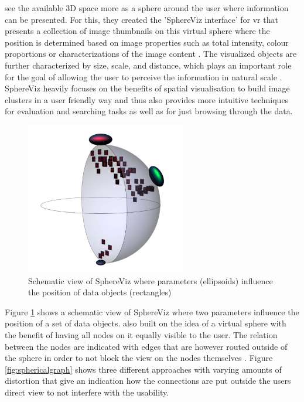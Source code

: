 \cite{Soldati2007} see the available 3D space more as a sphere around the user where information can be presented. For this, they created the 'SphereViz interface' for \gls{vr} that presents a collection of image thumbnails on this virtual sphere where the position is determined based on image properties such as total intensity, colour proportions or characterizations of the image content \citep{Soldati2007}. The visualized objects are further characterized by size, scale, and distance, which plays an important role for the goal of allowing the user to perceive the information in natural scale \citep{Soldati2007}. SphereViz heavily focuses on the benefits of spatial visualisation to build image clusters in a user friendly way and thus also provides more intuitive techniques for evaluation and searching tasks as well as for just browsing through the data.
\begin{figure}[h]
	\begin{center}
		\includegraphics[width=7cm]{03_Figures/05_LitReview/Soldati2007_SphereViz.png}
		\caption[Schematic view of SphereViz where parameters influence the position of data objects]{Schematic view of SphereViz where parameters (ellipsoids) influence the position of data objects (rectangles) \citep{Soldati2007}}
		\label{fig:sphereviz}
	\end{center}
\end{figure} \newline
Figure \ref{fig:sphereviz} shows a schematic view of SphereViz where two parameters influence the position of a set of data objects. \newline
\cite{Kwon2015} also built on the idea of a virtual sphere with the benefit of having all nodes on it equally visible to the user. The relation between the nodes are indicated with edges that are however routed outside of the sphere in order to not block the view on the nodes themselves \citep{Kwon2015}. Figure \ref{fig:sphericalgraph} shows three different approaches with varying amounts of distortion that give an indication how the connections are put outside the users direct view to not interfere with the usability.
